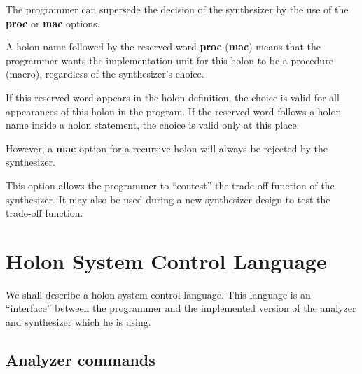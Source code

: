 \documentclass[openany,nobib]{tufte-book}
\newcommand{\kw}[1]{{\bf #1}}
\begin{document}
The programmer can supersede the decision of the synthesizer by the use of the
\kw{proc} or \kw{mac} options.

A holon name followed by the reserved word \kw{proc} (\kw{mac}) means that
the programmer wants the implementation unit for this holon to be a procedure
(macro), regardless of the synthesizer's choice.

If this reserved word appears in the holon definition, the choice is valid for
all appearances of this holon in the program. If the reserved word follows a
holon name inside a holon statement, the choice is valid only at this place.

However, a \kw{mac} option for a recursive holon will always be rejected by
the synthesizer.

This option allows the programmer to ``contest'' the trade-off function of the
synthesizer. It may also be used during a new synthesizer design to test the
trade-off function.

\chapter{Holon System Control Language}

We shall describe a holon system control language. This language is an
``interface'' between the programmer and the implemented version of the
analyzer and synthesizer which he is using.

\section{Analyzer commands}
\end{document}
